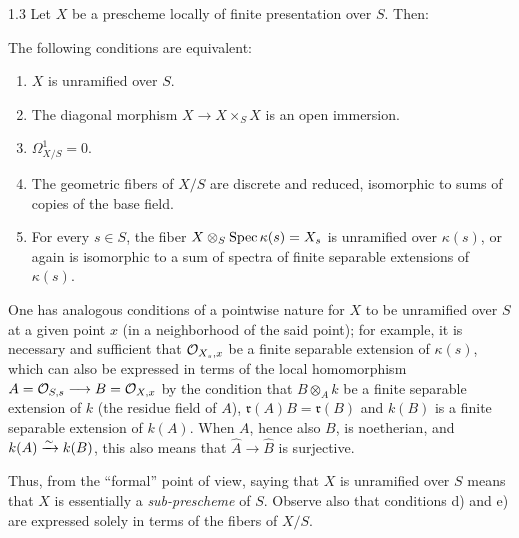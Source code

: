 \begin{proposition}{1.3}\label{XI.1.3}
Let $X$ be a prescheme locally of finite presentation over $S$. Then:
\begin{enumeratei}
\item The following conditions are equivalent:
\begin{enumerate}[label=\alph*)]
\item $X$ is unramified over $S$.
\item The diagonal morphism $X\to X\times_S X$ is an open immersion.
\item $\Omega^1_{X/S}=0$.
\item The geometric fibers of $X/S$ are discrete and reduced, \ie isomorphic to sums of copies of the base field.
\item For every $s\in S$, the fiber $X\otimes_S\operatorname{Spec}\kappa(s)=X_s$ is unramified over $\kappa(s)$, or again is isomorphic to a sum of spectra of finite separable extensions of $\kappa(s)$.
\end{enumerate}
\item One has analogous conditions of a pointwise nature for $X$ to be unramified over $S$ at a given point $x$ (\ie in a neighborhood of the said point); for example, it is necessary and sufficient that $\mathcal{O}_{X_s,x}$ be a finite separable extension of $\kappa(s)$, which can also be expressed in terms of the local homomorphism $A=\mathcal{O}_{S,s}\longrightarrow B=\mathcal{O}_{X,x}$ by the condition that $B\otimes_A k$ be a finite separable extension of $k$ (the residue field of $A$), \ie $\mathfrak r(A)B=\mathfrak r(B)$ and $k(B)$ is a finite separable extension of $k(A)$. When $A$, hence also $B$, is noetherian, and $k(A)\xrightarrow{\sim} k(B)$, this also means that $\widehat A\to\widehat B$ is surjective.
\end{enumeratei}
\end{proposition}
Thus, from the ``formal'' point of view, saying that $X$ is unramified over $S$ means that $X$ is essentially a \emph{sub-prescheme} of $S$. Observe also that conditions d) and e) are expressed solely in terms of the fibers of $X/S$.

